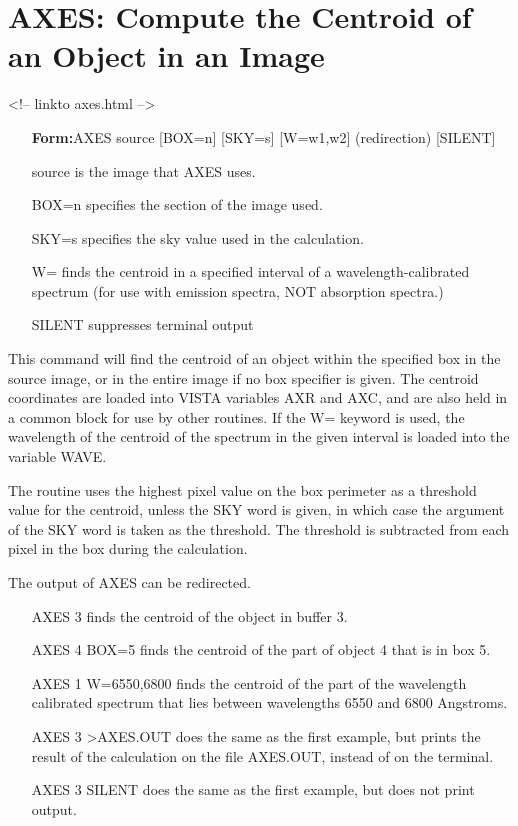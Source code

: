 \section{AXES: Compute the Centroid of an Object in an Image}
\begin{rawhtml}
<!-- linkto axes.html -->
\end{rawhtml}
\begin{itemize}
  \item[\textbf{Form:}AXES source {[BOX=n]} {[SKY=s]} {[W=w1,w2]} (redirection) {[SILENT]}\hfill]{}
  \item[source\hfill]{is the image that AXES uses.}
  \item[BOX=n\hfill]{specifies the section of the image used.}
  \item[SKY=s\hfill]{specifies the sky value used in the calculation.}
  \item[W=\hfill]{finds the centroid in a specified interval
of a wavelength-calibrated spectrum (for use
with emission spectra, NOT absorption spectra.)}
  \item[SILENT \hfill]{suppresses terminal output}
\end{itemize}

This command will find the centroid of an object within the specified box
in the source image, or in the entire image if no box specifier is
given. The centroid coordinates are loaded into VISTA variables AXR and
AXC, and are also held in a common block for use by other routines.  If the
W= keyword is used, the wavelength of the centroid of the spectrum in the
given interval is loaded into the variable WAVE.

The routine uses the highest pixel value on the box perimeter as a
threshold value for the centroid, unless the SKY word is given, in which
case the argument of the SKY word is taken as the threshold.  The threshold
is subtracted from each pixel in the box during the calculation.

The output of AXES can be redirected.

\begin{itemize}
  \item[AXES 3\hfill]{finds the centroid of the object in buffer 3.}
  \item[AXES 4 BOX=5\hfill]{finds the centroid of the part of
       object 4 that is in box 5.}
  \item[AXES 1 W=6550,6800\hfill]{finds the centroid of the part of
       the wavelength calibrated spectrum that lies between wavelengths 6550
       and 6800 Angstroms.}
  \item[AXES 3 >AXES.OUT\hfill]{does the same as the first example,
       but prints the result of the calculation on the file AXES.OUT, 
       instead of on the terminal.}
  \item[AXES 3 SILENT\hfill]{does the same as the first example,
       but does not print output.}
\end{itemize}
